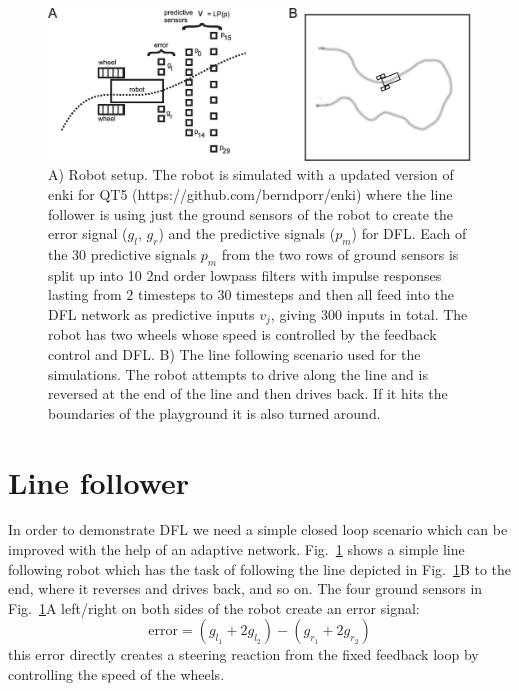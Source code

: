 \documentclass{llncs}
\begin{document}
\begin{figure}[h!]
  \centering
  \includegraphics[width=\columnwidth]{linefollower_robot_playground}
  \caption{A) Robot setup. The robot is simulated with a updated
    version of enki for QT5 (https://github.com/berndporr/enki)
    where the line follower is using just the ground sensors of the
    robot to create the error signal ($g_l$, $g_r$) and the predictive signals ($p_m$)
    for DFL. Each of the 30 predictive signals $p_m$ from the two rows of ground sensors
    is split up into 10 2nd order lowpass filters with impulse responses
    lasting from $2$ timesteps to $30$ timesteps and then all feed into the DFL
    network as predictive inputs $v_j$, giving 300 inputs in total.
    The robot has two wheels whose speed is controlled
    by the feedback control and DFL.
    B) The line following scenario used for the simulations. The robot
    attempts to drive along the line and is reversed at the end of the
    line and then drives back. If it hits the boundaries of the playground
    it is also turned around.
    \label{linefollower_robot_playground}}
\end{figure}




\section{Line follower}
In order to demonstrate DFL we need a simple closed loop scenario
which can be improved with the help of an adaptive network.
Fig.~\ref{linefollower_robot_playground} shows a simple line following
robot which has the task of following the line depicted in
Fig.~\ref{linefollower_robot_playground}B to the end, where it
reverses and drives back, and so on. The four ground sensors in
Fig.~\ref{linefollower_robot_playground}A left/right on both sides
of the robot create an error signal:
\begin{equation}
\mathrm{error} = (g_{l_1}+2 g_{l_2})-(g_{r_1}+2 g_{r_2}) \label{line_error}
\end{equation}
this error directly creates a steering reaction from the fixed
feedback loop by controlling the speed of the wheels.
\end{document}
